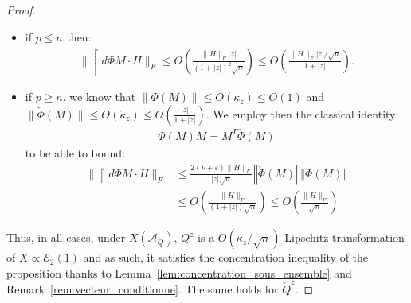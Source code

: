 \documentclass[a4papaer, titlepage]{book}
\begin{document}
\begin{proof}
\begin{itemize}
    \item if %
    $p \leq n$ then:
    \begin{align*}
      \|\restriction{d\Phi }{M} \cdot H\|_F \leq O \left(\frac{\|H\|_F |z|}{(1 + |z|)^2\sqrt n}\right)\leq O \left(\frac{\|H\|_F |z|/\sqrt n}{1 + |z|}\right).
    \end{align*}
    \item if %
    $p \geq n$, we know that $\|\Phi(M)\| \leq O(\kappa_z) \leq O(1)$ and $\|\check \Phi(M)\| \leq O(\check\kappa_z) \leq O(\frac{|z|}{1+ |z|})$. We employ then the classical identity:
    \begin{align}\label{eq:lien_Q_Q_check}
      \Phi(M)M = M^T \check \Phi(M)
    \end{align}
    to be able to bound:
    \begin{align*}
      \|\restriction{d\Phi }{M} \cdot H\|_F 
      &\leq \frac{2 (\nu + \varepsilon) \|H\|_F}{|z| \sqrt n}\left\Vert  \check\Phi(M)  \right\Vert \left\Vert\Phi \left(M\right)\right\Vert  \\
      &\leq O \left(\frac{\|H\|_F }{(1 + |z|)\sqrt n}\right) %
      \leq O \left(\frac{\|H\|_F}{\sqrt n}\right)
    \end{align*}
  \end{itemize}
  Thus, in all cases, under $X(\mathcal A_Q)$, $Q^z$ is a $O(\kappa_z/\sqrt n)$-Lipschitz transformation of $X\propto \mathcal E_2 (1)$ and as such, it satisfies the concentration inequality of the proposition thanks to Lemma~\ref{lem:concentration_sous_ensemble} and Remark~\ref{rem:vecteur_conditionne}. The same holds for $\check Q^z$.
\end{proof}
\end{document}
